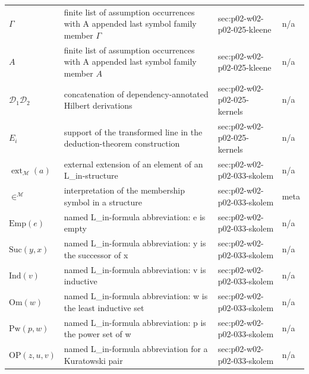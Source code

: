 \begin{longtable}{@{}p{}p{}p{}p{}@{}}
\(\Gamma\) & finite list of assumption occurrences with A appended last symbol family member \(\Gamma\) & sec:\allowbreak{}p02-\allowbreak{}w02-\allowbreak{}p02-\allowbreak{}025-\allowbreak{}kleene & n/a \\
\(A\) & finite list of assumption occurrences with A appended last symbol family member \(A\) & sec:\allowbreak{}p02-\allowbreak{}w02-\allowbreak{}p02-\allowbreak{}025-\allowbreak{}kleene & n/a \\
\(\mathcal D_1\mathcal D_2\) & concatenation of dependency-annotated Hilbert derivations & sec:\allowbreak{}p02-\allowbreak{}w02-\allowbreak{}p02-\allowbreak{}025-\allowbreak{}kernels & n/a \\
\(E_i\) & support of the transformed line in the deduction-theorem construction & sec:\allowbreak{}p02-\allowbreak{}w02-\allowbreak{}p02-\allowbreak{}025-\allowbreak{}kernels & n/a \\
\(\operatorname{ext}_{\mathcal M}(a)\) & external extension of an element of an L\_in-structure & sec:\allowbreak{}p02-\allowbreak{}w02-\allowbreak{}p02-\allowbreak{}033-\allowbreak{}skolem & n/a \\
\(\in^{\mathcal M}\) & interpretation of the membership symbol in a structure & sec:\allowbreak{}p02-\allowbreak{}w02-\allowbreak{}p02-\allowbreak{}033-\allowbreak{}skolem & meta \\
\(\mathrm{Emp}(e)\) & named L\_in-formula abbreviation: e is empty & sec:\allowbreak{}p02-\allowbreak{}w02-\allowbreak{}p02-\allowbreak{}033-\allowbreak{}skolem & n/a \\
\(\mathrm{Suc}(y,\allowbreak x)\) & named L\_in-formula abbreviation: y is the successor of x & sec:\allowbreak{}p02-\allowbreak{}w02-\allowbreak{}p02-\allowbreak{}033-\allowbreak{}skolem & n/a \\
\(\mathrm{Ind}(v)\) & named L\_in-formula abbreviation: v is inductive & sec:\allowbreak{}p02-\allowbreak{}w02-\allowbreak{}p02-\allowbreak{}033-\allowbreak{}skolem & n/a \\
\(\mathrm{Om}(w)\) & named L\_in-formula abbreviation: w is the least inductive set & sec:\allowbreak{}p02-\allowbreak{}w02-\allowbreak{}p02-\allowbreak{}033-\allowbreak{}skolem & n/a \\
\(\mathrm{Pw}(p,\allowbreak w)\) & named L\_in-formula abbreviation: p is the power set of w & sec:\allowbreak{}p02-\allowbreak{}w02-\allowbreak{}p02-\allowbreak{}033-\allowbreak{}skolem & n/a \\
\(\mathrm{OP}(z,\allowbreak u,\allowbreak v)\) & named L\_in-formula abbreviation for a Kuratowski pair & sec:\allowbreak{}p02-\allowbreak{}w02-\allowbreak{}p02-\allowbreak{}033-\allowbreak{}skolem & n/a \\

\end{longtable}
